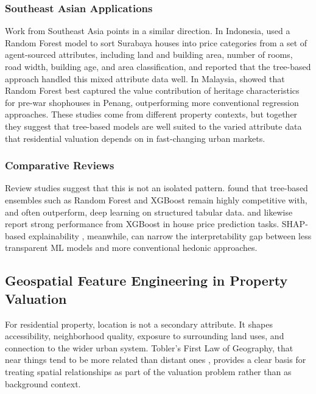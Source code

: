 \subsubsection{Southeast Asian Applications}\label{southeast-asian-applications}

Work from Southeast Asia points in a similar direction. In Indonesia, \textcite{tanamal2023} used a Random Forest model to sort Surabaya houses into price categories from a set of agent-sourced attributes, including land and building area, number of rooms, road width, building age, and area classification, and reported that the tree-based approach handled this mixed attribute data well. In Malaysia, \textcite{jaafar2021} showed that Random Forest best captured the value contribution of heritage characteristics for pre-war shophouses in Penang, outperforming more conventional regression approaches. These studies come from different property contexts, but together they suggest that tree-based models are well suited to the varied attribute data that residential valuation depends on in fast-changing urban markets.

\subsubsection{Comparative Reviews}\label{comparative-reviews}

Review studies suggest that this is not an isolated pattern. \textcite{grinsztajn2022} found that tree-based ensembles such as Random Forest and XGBoost remain highly competitive with, and often outperform, deep learning on structured tabular data. \textcite{moreno2025} and \textcite{sharma2024} likewise report strong performance from XGBoost in house price prediction tasks. SHAP-based explainability \parencite{lundberg2017}, meanwhile, can narrow the interpretability gap between less transparent ML models and more conventional hedonic approaches.


\subsection{Geospatial Feature Engineering in Property Valuation}\label{geospatial-feature-engineering-in-property-valuation}

For residential property, location is not a secondary attribute. It shapes accessibility, neighborhood quality, exposure to surrounding land uses, and connection to the wider urban system. Tobler's First Law of Geography, that near things tend to be more related than distant ones \parencite{tobler1970movie}, provides a clear basis for treating spatial relationships as part of the valuation problem rather than as background context.

